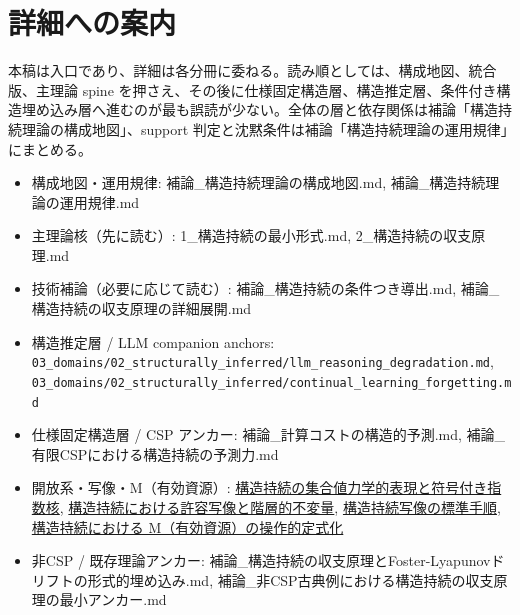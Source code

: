 \documentclass[12pt,a4paper]{article}
\begin{document}
\section{詳細への案内}\label{ux8a73ux7d30ux3078ux306eux6848ux5185}

本稿は入口であり、詳細は各分冊に委ねる。読み順としては、構成地図、統合版、主理論 spine を押さえ、その後に仕様固定構造層、構造推定層、条件付き構造埋め込み層へ進むのが最も誤読が少ない。全体の層と依存関係は補論「構造持続理論の構成地図」、support 判定と沈黙条件は補論「構造持続理論の運用規律」にまとめる。

\begin{itemize}
\tightlist
\item
  構成地図・運用規律: 補論\_構造持続理論の構成地図.md, 補論\_構造持続理論の運用規律.md
\item
  主理論核（先に読む）: 1\_構造持続の最小形式.md, 2\_構造持続の収支原理.md
\item
  技術補論（必要に応じて読む）: 補論\_構造持続の条件つき導出.md, 補論\_構造持続の収支原理の詳細展開.md
\item
  構造推定層 / LLM companion anchors: \texttt{03\_domains/02\_structurally\_inferred/llm\_reasoning\_degradation.md}, \texttt{03\_domains/02\_structurally\_inferred/continual\_learning\_forgetting.md}
\item
  仕様固定構造層 / CSP アンカー: 補論\_計算コストの構造的予測.md, 補論\_有限CSPにおける構造持続の予測力.md
\item
  開放系・写像・M（有効資源）: \href{../02_foundations/23_set_valued_dynamics.md}{構造持続の集合値力学的表現と符号付き指数核}, \href{../02_foundations/22_admissible_maps.md}{構造持続における許容写像と階層的不変量}, \href{../04_operations/50_standard_mapping_procedure.md}{構造持続写像の標準手順}, \href{../04_operations/52_resource_M.md}{構造持続における M（有効資源）の操作的定式化}
\item
  非CSP / 既存理論アンカー: 補論\_構造持続の収支原理とFoster-Lyapunovドリフトの形式的埋め込み.md, 補論\_非CSP古典例における構造持続の収支原理の最小アンカー.md
\end{itemize}
\end{document}
